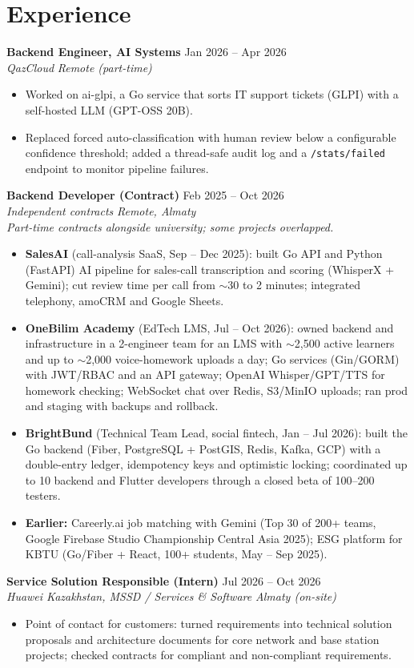 \documentclass[10pt,a4paper]{article}
\newcommand{\resumeEntry}[4]{%
  \textbf{#1} \hfill #2\\
  \textit{#3} \hfill \textit{#4}\vspace{-2pt}
}
\begin{document}
\section{Experience}
\resumeEntry{Backend Engineer, AI Systems}{Jan 2026 -- Apr 2026}{QazCloud}{Remote (part-time)}
\begin{itemize}
  \item Worked on ai-glpi, a Go service that sorts IT support tickets (GLPI) with a self-hosted LLM (GPT-OSS 20B).
  \item Replaced forced auto-classification with human review below a configurable confidence threshold; added a thread-safe audit log and a \texttt{/stats/failed} endpoint to monitor pipeline failures.
\end{itemize}

\resumeEntry{Backend Developer (Contract)}{Feb 2025 -- Oct 2026}{Independent contracts}{Remote, Almaty}\\
\textit{Part-time contracts alongside university; some projects overlapped.}
\begin{itemize}
  \item \textbf{SalesAI} (call-analysis SaaS, Sep -- Dec 2025): built Go API and Python (FastAPI) AI pipeline for sales-call transcription and scoring (WhisperX + Gemini); cut review time per call from $\sim$30 to 2 minutes; integrated telephony, amoCRM and Google Sheets.
  \item \textbf{OneBilim Academy} (EdTech LMS, Jul -- Oct 2026): owned backend and infrastructure in a 2-engineer team for an LMS with $\sim$2,500 active learners and up to $\sim$2,000 voice-homework uploads a day; Go services (Gin/GORM) with JWT/RBAC and an API gateway; OpenAI Whisper/GPT/TTS for homework checking; WebSocket chat over Redis, S3/MinIO uploads; ran prod and staging with backups and rollback.
  \item \textbf{BrightBund} (Technical Team Lead, social fintech, Jan -- Jul 2026): built the Go backend (Fiber, PostgreSQL + PostGIS, Redis, Kafka, GCP) with a double-entry ledger, idempotency keys and optimistic locking; coordinated up to 10 backend and Flutter developers through a closed beta of 100--200 testers.
  \item \textbf{Earlier:} Careerly.ai job matching with Gemini (Top 30 of 200+ teams, Google Firebase Studio Championship Central Asia 2025); ESG platform for KBTU (Go/Fiber + React, 100+ students, May -- Sep 2025).
\end{itemize}

\resumeEntry{Service Solution Responsible (Intern)}{Jul 2026 -- Oct 2026}{Huawei Kazakhstan, MSSD / Services \& Software}{Almaty (on-site)}
\begin{itemize}
  \item Point of contact for customers: turned requirements into technical solution proposals and architecture documents for core network and base station projects; checked contracts for compliant and non-compliant requirements.
\end{itemize}
\end{document}
